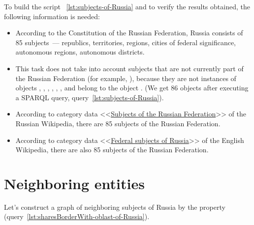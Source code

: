 To build the script ~\protect\ref{lst:subjects-of-Russia} and to verify the results obtained, the following information is needed:
\begin{itemize}
\item According to the Constitution of the Russian Federation, Russia consists of 85 subjects~--- republics, territories, regions, cities of federal significance, autonomous regions, autonomous districts.
  \item This task does not take into account subjects that are not currently part of the Russian Federation (for example, ), because they are not instances of objects , , , , , , and belong to the object . (We get 86 objects after executing a SPARQL query, query~\protect\ref{lst:subjects-of-Russia}). 
  \item According to category data <<\href{https://ru.wikipedia.org/wiki/Subjects of the Russian Federation}{Subjects of the Russian Federation}>> of the Russian Wikipedia, there are 85 subjects of the Russian Federation.
  \item According to category data <<\href{https://ru.wikipedia.org/wiki/en:Federal_subjects_of_Russia}{Federal subjects of Russia}>> of the English Wikipedia, there are also 85 subjects of the Russian Federation.
\end{itemize}

\section{Neighboring entities}

Let's construct a graph of neighboring subjects of Russia by the property  (query~\protect\ref{lst:sharesBorderWith-oblast-of-Russia}).

